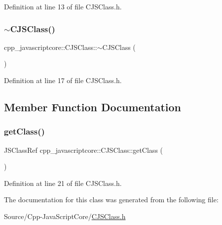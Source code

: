 Definition at line 13 of file C\+J\+S\+Class.\+h.

\mbox{\label{classcpp__javascriptcore_1_1_c_j_s_class_a24e99d07c375b6bbc30abbea7a8a528b}} 
\subsubsection{\texorpdfstring{$\sim$\+C\+J\+S\+Class()}{~CJSClass()}}
{\footnotesize\ttfamily cpp\+\_\+javascriptcore\+::\+C\+J\+S\+Class\+::$\sim$\+C\+J\+S\+Class (\begin{DoxyParamCaption}{ }\end{DoxyParamCaption})\hspace{0.3cm}{\ttfamily [inline]}}



Definition at line 17 of file C\+J\+S\+Class.\+h.



\subsection{Member Function Documentation}
\mbox{\label{classcpp__javascriptcore_1_1_c_j_s_class_acb05238883927560fa7e43001226bc91}} 
\subsubsection{\texorpdfstring{get\+Class()}{getClass()}}
{\footnotesize\ttfamily J\+S\+Class\+Ref cpp\+\_\+javascriptcore\+::\+C\+J\+S\+Class\+::get\+Class (\begin{DoxyParamCaption}{ }\end{DoxyParamCaption})\hspace{0.3cm}{\ttfamily [inline]}}



Definition at line 21 of file C\+J\+S\+Class.\+h.



The documentation for this class was generated from the following file\+:\begin{DoxyCompactItemize}
\item 
Source/\+Cpp-\/\+Java\+Script\+Core/\mbox{\hyperlink{_c_j_s_class_8h}{C\+J\+S\+Class.\+h}}\end{DoxyCompactItemize}
